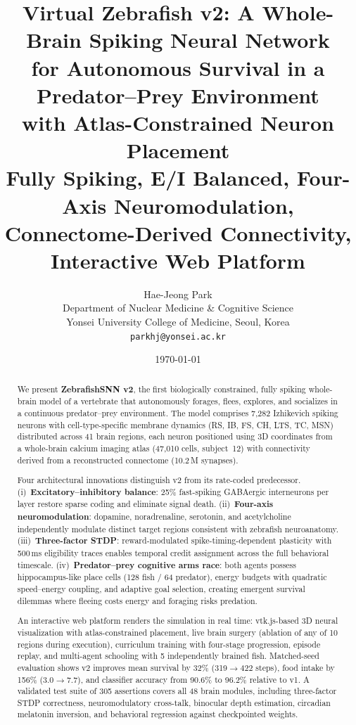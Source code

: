 \documentclass[11pt,a4paper]{article}
\title{%
  \textbf{Virtual Zebrafish v2: A Whole-Brain Spiking Neural Network\\
  for Autonomous Survival in a Predator--Prey Environment\\
  with Atlas-Constrained Neuron Placement}\\[8pt]
  \large Fully Spiking, E/I Balanced, Four-Axis Neuromodulation,\\
  \large Connectome-Derived Connectivity, Interactive Web Platform
}
\author{Hae-Jeong Park\\
  Department of Nuclear Medicine \& Cognitive Science\\
  Yonsei University College of Medicine, Seoul, Korea\\
  \texttt{parkhj@yonsei.ac.kr}
}
\date{\today}
\begin{document}
\maketitle

\begin{abstract}
We present \textbf{ZebrafishSNN v2}, the first biologically constrained,
fully spiking whole-brain model of a vertebrate that autonomously forages,
flees, explores, and socializes in a continuous predator--prey environment.
The model comprises 7,282 Izhikevich spiking neurons with cell-type-specific
membrane dynamics (RS, IB, FS, CH, LTS, TC, MSN) distributed across 41 brain
regions, each neuron positioned using 3D coordinates from a whole-brain calcium
imaging atlas (47,010 cells, subject~12) with connectivity derived from a
reconstructed connectome (10.2\,M synapses).

Four architectural innovations distinguish v2 from its rate-coded predecessor.
(i)~\textbf{Excitatory--inhibitory balance}: 25\% fast-spiking GABAergic
interneurons per layer restore sparse coding and eliminate signal death.
(ii)~\textbf{Four-axis neuromodulation}: dopamine, noradrenaline, serotonin,
and acetylcholine independently modulate distinct target regions consistent
with zebrafish neuroanatomy.
(iii)~\textbf{Three-factor STDP}: reward-modulated spike-timing-dependent
plasticity with 500\,ms eligibility traces enables temporal credit assignment
across the full behavioral timescale.
(iv)~\textbf{Predator--prey cognitive arms race}: both agents possess
hippocampus-like place cells (128 fish / 64 predator), energy budgets with
quadratic speed--energy coupling, and adaptive goal selection, creating
emergent survival dilemmas where fleeing costs energy and foraging risks predation.

An interactive web platform renders the simulation in real time: vtk.js-based
3D neural visualization with atlas-constrained placement, live brain surgery
(ablation of any of 10 regions during execution), curriculum training with
four-stage progression, episode replay, and multi-agent schooling with 5
independently brained fish.
Matched-seed evaluation shows v2 improves mean survival by 32\% (319$\to$422
steps), food intake by 156\% (3.0$\to$7.7), and classifier accuracy from
90.6\% to 96.2\% relative to v1.
A validated test suite of 305 assertions covers all 48 brain modules,
including three-factor STDP correctness, neuromodulatory cross-talk,
binocular depth estimation, circadian melatonin inversion, and
behavioral regression against checkpointed weights.
\end{abstract}
\end{document}
